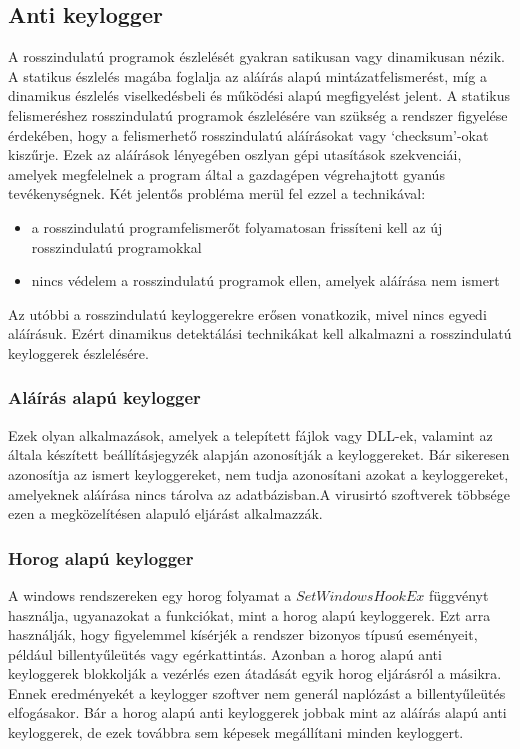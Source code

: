 \documentclass[a4paper, 11pt]{article}
\begin{document}
\subsection{Anti keylogger}
\cite{wood2010keyloggers} A rosszindulatú programok észlelését gyakran satikusan vagy dinamikusan nézik. A statikus észlelés magába foglalja az aláírás alapú mintázatfelismerést, míg a dinamikus észlelés viselkedésbeli és működési alapú megfigyelést jelent. A statikus felismeréshez rosszindulatú programok észlelésére van szükség a rendszer figyelése érdekében, hogy a felismerhető rosszindulatú aláírásokat vagy `checksum'-okat kiszűrje. Ezek az aláírások lényegében oszlyan gépi utasítások szekvenciái, amelyek megfelelnek a program által a gazdagépen végrehajtott gyanús tevékenységnek. Két jelentős probléma merül fel ezzel a technikával:
\begin{itemize}
\item a rosszindulatú programfelismerőt folyamatosan frissíteni kell az új rosszindulatú programokkal
\item nincs védelem a rosszindulatú programok ellen, amelyek aláírása nem ismert
\end{itemize}
Az utóbbi a rosszindulatú keyloggerekre erősen vonatkozik, mivel nincs egyedi aláírásuk. Ezért dinamikus detektálási technikákat kell alkalmazni a rosszindulatú keyloggerek észlelésére.

\subsubsection{Aláírás alapú keylogger}
\cite{tuli2013system} Ezek olyan alkalmazások, amelyek a telepített fájlok vagy DLL-ek, valamint az általa készített beállításjegyzék alapján azonosítják a keyloggereket. Bár sikeresen azonosítja az ismert keyloggereket, nem tudja azonosítani azokat a keyloggereket, amelyeknek aláírása nincs tárolva az adatbázisban.A virusirtó szoftverek többsége ezen a megközelítésen alapuló eljárást alkalmazzák.

\subsubsection{Horog alapú keylogger}
\cite{tuli2013system} A windows rendszereken egy horog folyamat a $SetWindowsHookEx$ függvényt használja, ugyanazokat a funkciókat, mint a horog alapú keyloggerek. Ezt arra használják, hogy figyelemmel kísérjék a rendszer bizonyos típusú eseményeit, például billentyűleütés vagy egérkattintás. Azonban a horog alapú anti keyloggerek blokkolják a vezérlés ezen átadását egyik horog eljárásról a másikra. Ennek eredményekét a keylogger szoftver nem generál naplózást a billentyűleütés elfogásakor. Bár a horog alapú anti keyloggerek jobbak mint az aláírás alapú anti keyloggerek, de ezek továbbra sem képesek megállítani minden keyloggert.
\end{document}
